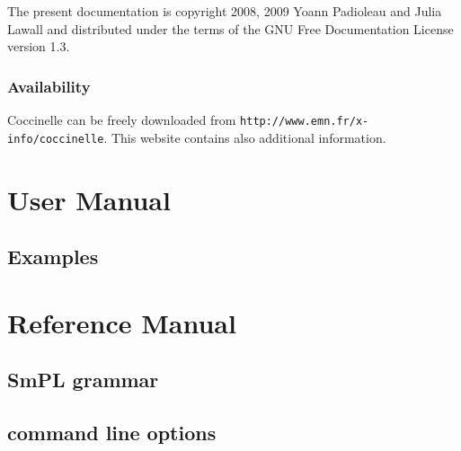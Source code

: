 \documentclass{report}
\begin{document}
The present documentation is copyright 2008, 2009 Yoann Padioleau
and Julia Lawall and distributed under the terms of the 
GNU Free Documentation License version 1.3.

\section*{Availability}

Coccinelle can be freely downloaded 
from \verb+http://www.emn.fr/x-info/coccinelle+.
This website contains also additional information.


\part{User Manual}
\label{part:usermanual}



 



\chapter{Examples}
















\part{Reference Manual}
\label{part:refmanual}

\chapter{SmPL grammar}



\chapter{\spatch command line options}





{\small 


}


\end{document}
